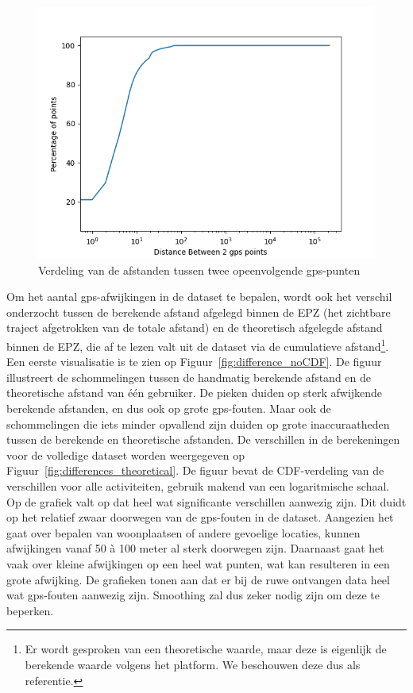 \begin{figure}[h]
    \centering
    \includegraphics[width=\textwidth]{fig/Afwijkingen&Analyses/Graphs/Afstand tussen 2 gps-punten.png}
    \caption{Verdeling van de afstanden tussen twee opeenvolgende gps-punten}\label{fig:distance_between_gps_points_CDF}
\end{figure}

Om het aantal \ac{gps}-afwijkingen in de dataset te bepalen, wordt ook het
verschil onderzocht tussen de berekende afstand afgelegd binnen de \ac{EPZ}
(het zichtbare traject afgetrokken van de totale afstand) en de theoretisch
afgelegde afstand binnen de \ac{EPZ}, die af te lezen valt uit de dataset via
de cumulatieve afstand\footnote{Er wordt gesproken van een theoretische waarde,
    maar deze is eigenlijk de berekende waarde volgens het platform. We beschouwen
    deze dus als referentie.}. Een eerste visualisatie is te zien op
Figuur~\ref{fig:difference_noCDF}. De figuur illustreert de schommelingen
tussen de handmatig berekende afstand en de theoretische afstand van één
gebruiker. De pieken duiden op sterk afwijkende berekende afstanden, en dus ook
op grote \ac{gps}-fouten. Maar ook de schommelingen die iets minder opvallend
zijn duiden op grote inaccuraatheden tussen de berekende en theoretische
afstanden. De verschillen in de berekeningen voor de volledige dataset worden
weergegeven op Figuur~\ref{fig:differences_theoretical}. De figuur bevat de
\ac{CDF}-verdeling van de verschillen voor alle activiteiten, gebruik makend
van een logaritmische schaal. Op de grafiek valt op dat heel wat significante
verschillen aanwezig zijn. Dit duidt op het relatief zwaar doorwegen van de
\ac{gps}-fouten in de dataset. Aangezien het gaat over bepalen van woonplaatsen
of andere gevoelige locaties, kunnen afwijkingen vanaf 50 à 100 meter al sterk
doorwegen zijn. Daarnaast gaat het vaak over kleine afwijkingen op een heel wat
punten, wat kan resulteren in een grote afwijking. De grafieken tonen aan dat
er bij de ruwe ontvangen data heel wat \ac{gps}-fouten aanwezig zijn. Smoothing
zal dus zeker nodig zijn om deze te beperken.

